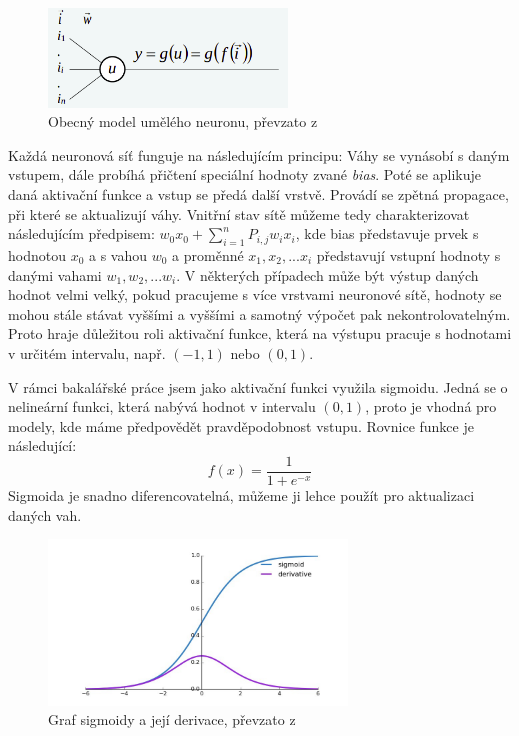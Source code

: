 \begin{figure}[!htbp]
    \centering
    \includegraphics[width=240px]{obrazky-figures/neuron.png}
    \caption{Obecný model umělého neuronu, převzato z \cite{PrednaskaIZU9}}
\end{figure}

Každá neuronová síť funguje na následujícím principu: Váhy se vynásobí s daným vstupem, dále probíhá přičtení speciální hodnoty zvané \textit{bias}. Poté se aplikuje daná aktivační funkce a vstup se předá další vrstvě. Provádí se zpětná propagace, při které se aktualizují váhy. Vnitřní stav sítě můžeme tedy charakterizovat následujícím předpisem: $w_0x_0 + \sum_{i=1}^{n}P_{i,j}w_ix_i$, kde bias představuje prvek s hodnotou $x_0$ a s vahou $w_0$ a proměnné $x_1, x_2, ...x_i$ představují vstupní hodnoty s danými vahami $w_1, w_2, ...w_i$. V některých případech může být výstup daných hodnot velmi velký, pokud pracujeme s více vrstvami neuronové sítě, hodnoty se mohou stále stávat vyššími a vyššími a samotný výpočet pak nekontrolovatelným. Proto hraje důležitou roli aktivační funkce, která na výstupu pracuje s hodnotami v určitém intervalu, např. $(-1, 1)$ nebo $(0, 1)$. \cite{MediumDeepLearning} 

V rámci bakalářské práce jsem jako aktivační funkci využila sigmoidu. Jedná se o nelineární funkci, která nabývá hodnot v intervalu $(0, 1)$, proto je vhodná pro modely, kde máme předpovědět pravděpodobnost vstupu. Rovnice funkce je následující:
$$f(x)=\frac{1}{1+e^{-x}}$$
Sigmoida je snadno diferencovatelná, můžeme ji lehce použít pro aktualizaci daných vah.

\begin{figure}[!htbp]
    \centering
    \includegraphics[width=300px]{obrazky-figures/sigmoid.jpeg}
    \caption{Graf sigmoidy a její derivace, převzato z \cite{MediumDeepLearning}}
\end{figure}

